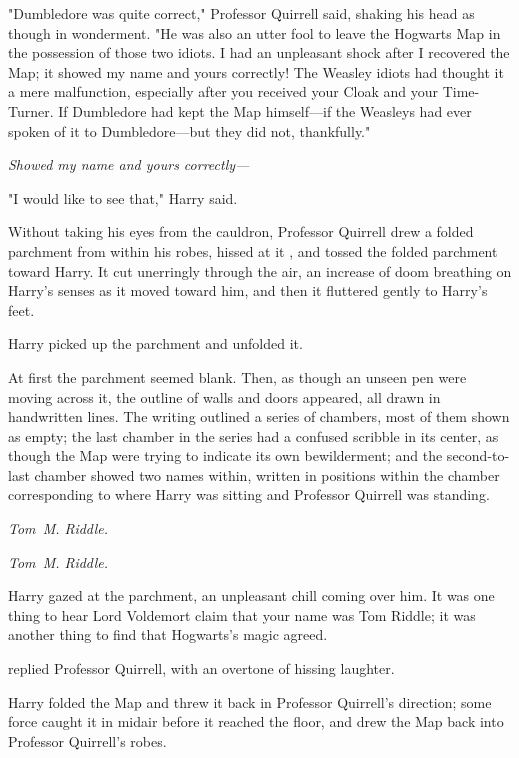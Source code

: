"Dumbledore was quite correct," Professor Quirrell said, shaking his head as
though in wonderment. "He was also an utter fool to leave the Hogwarts Map in
the possession of those two idiots. I had an unpleasant shock after I recovered
the Map; it showed my name and yours correctly! The Weasley idiots had thought
it a mere malfunction, especially after you received your Cloak and your
Time-Turner. If Dumbledore had kept the Map himself---if the Weasleys had ever
spoken of it to Dumbledore---but they did not, thankfully."

\emph{Showed my name and yours correctly---}

"I would like to see that," Harry said.

Without taking his eyes from the cauldron, Professor Quirrell drew a folded
parchment from within his robes, hissed at it , and tossed the folded parchment toward Harry. It cut
unerringly through the air, an increase of doom breathing on Harry's senses as
it moved toward him, and then it fluttered gently to Harry's feet.

Harry picked up the parchment and unfolded it.

At first the parchment seemed blank. Then, as though an unseen pen were moving
across it, the outline of walls and doors appeared, all drawn in handwritten
lines. The writing outlined a series of chambers, most of them shown as empty;
the last chamber in the series had a confused scribble in its center, as though
the Map were trying to indicate its own bewilderment; and the second-to-last
chamber showed two names within, written in positions within the chamber
corresponding to where Harry was sitting and Professor Quirrell was standing.

\emph{Tom~M. Riddle.}

\emph{Tom~M. Riddle.}

Harry gazed at the parchment, an unpleasant chill coming over him. It was one
thing to hear Lord Voldemort claim that your name was Tom Riddle; it was
another thing to find that Hogwarts's magic agreed. 

 replied Professor Quirrell, with an overtone of
hissing laughter. 

Harry folded the Map and threw it back in Professor Quirrell's direction; some
force caught it in midair before it reached the floor, and drew the Map back
into Professor Quirrell's robes.

